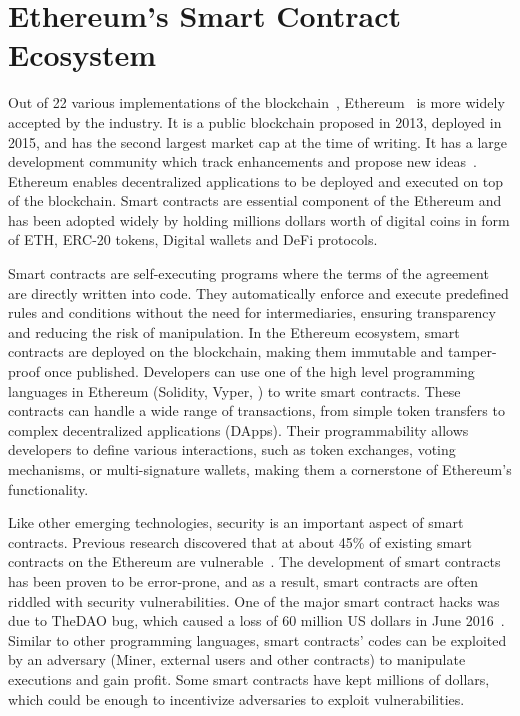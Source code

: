 \section{Ethereum's Smart Contract Ecosystem}
Out of 22 various implementations of the blockchain~\cite{builtin2024}, Ethereum~\cite{EIP150} is more widely accepted by the industry. It is a public blockchain proposed in 2013, deployed in 2015, and has the second largest market cap at the time of writing. It has a large development community which track enhancements and propose new ideas~\cite{CoinDesk20}. Ethereum enables decentralized applications to be deployed and executed on top of the blockchain. Smart contracts are essential component of the Ethereum and has been adopted widely by holding millions dollars worth of digital coins in form of ETH, ERC-20 tokens, Digital wallets and DeFi protocols.

Smart contracts are self-executing programs where the terms of the agreement are directly written into code. They automatically enforce and execute predefined rules and conditions without the need for intermediaries, ensuring transparency and reducing the risk of manipulation. In the Ethereum ecosystem, smart contracts are deployed on the blockchain, making them immutable and tamper-proof once published. Developers can use one of the high level programming languages in Ethereum (\eg Solidity, Vyper, \etc) to write smart contracts. These contracts can handle a wide range of transactions, from simple token transfers to complex decentralized applications (DApps). Their programmability allows developers to define various interactions, such as token exchanges, voting mechanisms, or multi-signature wallets, making them a cornerstone of Ethereum’s functionality.

Like other emerging technologies, security is an important aspect of smart contracts. Previous research discovered that at about 45\% of existing smart contracts on the Ethereum are vulnerable~\cite{SmartContractSecurity}. The development of smart contracts has been proven to be error-prone, and as a result, smart contracts are often riddled with security vulnerabilities. One of the major smart contract hacks was due to TheDAO bug, which caused a loss of 60 million US dollars in June 2016~\cite{TheDAOCoinDesk}. Similar to other programming languages, smart contracts' codes can be exploited by an adversary (\ie Miner, external users and other contracts) to manipulate executions and gain profit. Some smart contracts have kept millions of dollars, which could be enough to incentivize adversaries to exploit vulnerabilities.

